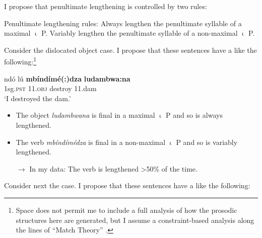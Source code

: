 \documentclass[output=paper,modfonts,nonflat,draftmode]{langsci/langscibook}
\begin{document}
\noindent
I propose that penultimate lengthening is controlled by two rules:


\ea \label{ex:kusmer:lengthening_rules} {Penultimate lengthening rules:}
\ea Always lengthen the penultimate syllable of a maximal $\upiota$ P.
\ex Variably lengthen the penultimate syllable of a non-maximal $\upiota$ P.
\z
\z

Consider the dislocated object case. I propose that these sentences have a
 like the following:\footnote{Space does not permit me to
include a full analysis of how the prosodic structures here are generated, but I
assume a constraint-based analysis along the lines of  ``{Match} Theory''
\citep{Selkirk11}.}



\ea \label{ex:kusmer:disloc_pros} 
\gll {\lipm} {\lipn} ndó lú \textbf{mbíndímé(:)dza} {\ripn} \textbf{ludambwa:na} {\ripm}\\
{} {} 1sg.\textsc{pst}  \textsc{11.obj} destroy {} 11.dam {}\\
	\glt  `I destroyed the dam.'
\z

\begin{itemize}
	\item The object \textit{ludambwana} is final in a maximal $\upiota$ P and so is always
		lengthened.
	\item The verb \textit{mbíndímédza} is final in a non-maximal $\upiota$ P and so is
		variably lengthened.
	\item[$\rightarrow$] In my data: The verb is lengthened >50\% of the time.
\end{itemize}

\noindent
Consider next the  case. I propose that these sentences
have a  like the following:

\end{document}
